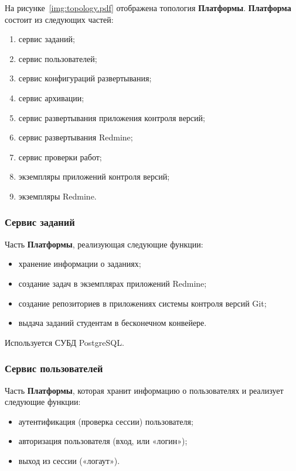 На рисунке~\ref{img:topology.pdf} отображена топология \textbf{Платформы}. \textbf{Платформа} состоит из следующих частей:

\begin{enumerate}
	\item сервис заданий;
	\item сервис пользователей;
	\item сервис конфигураций развертывания;
	\item сервис архивации;
	\item сервис развертывания приложения контроля версий;
	\item сервис развертывания Redmine;
	\item сервис проверки работ;
	\item экземпляры приложений контроля версий;
	\item экземпляры Redmine.
\end{enumerate}

\newpage


\subsubsection*{Сервис заданий}

Часть \textbf{Платформы}, реализующая следующие функции:
\begin{itemize}
    \item хранение информации о заданиях;
    \item создание задач в экземплярах приложений Redmine;
    \item создание репозиториев в приложениях системы контроля версий Git;
    \item выдача заданий студентам в бесконечном конвейере. 
\end{itemize}

Используется СУБД PostgreSQL.

\subsubsection*{Сервис пользователей}

Часть \textbf{Платформы}, которая хранит информацию о пользователях и реализует следующие функции:
\begin{itemize}
	\item аутентификация (проверка сессии) пользователя;
	\item авторизация пользователя (вход, или «логин»);
	\item выход из сессии («логаут»).
\end{itemize}

